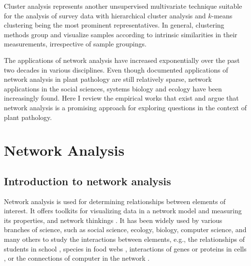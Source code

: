 \documentclass[12pt, oneside]{report}
\begin{document}
Cluster analysis represents another unsupervised multivariate technique suitable for the analysis of survey data with hierarchical cluster analysis and $k$-means clustering  being the most prominent representatives. In general, clustering methods group and visualize samples according to intrinsic similarities in their measurements, irrespective of sample groupings. 





The applications of network analysis have increased exponentially over the past two decades in various disciplines. Even though documented applications of network analysis in plant pathology are still relatively sparse, network applications in the social sciences, systems biology and ecology have been increasingly found. Here I review the empirical works that exist and argue that network analysis is a promising approach for exploring questions in the context of plant pathology.





\section*{Network Analysis}
\subsection*{Introduction to network analysis}
Network analysis is used for determining relationships between elements of interest. It offers toolkits for visualizing data in a network model and measuring its properties, and network thinkings \citep{PROULX:2005hx}. It has been widely used by various branches of science, such as social science, ecology, biology, computer science, and many others to study the interactions between elements, e.g., the relationships of students in school \citep{moody2001race}, species in food webs \citep{krause2003compartments}, interactions of genes or proteins in cells \citep{guimera2005functional}, or the connections of computer in the network \citep{pastor2001epidemic, newman2006modularity}.
\end{document}
